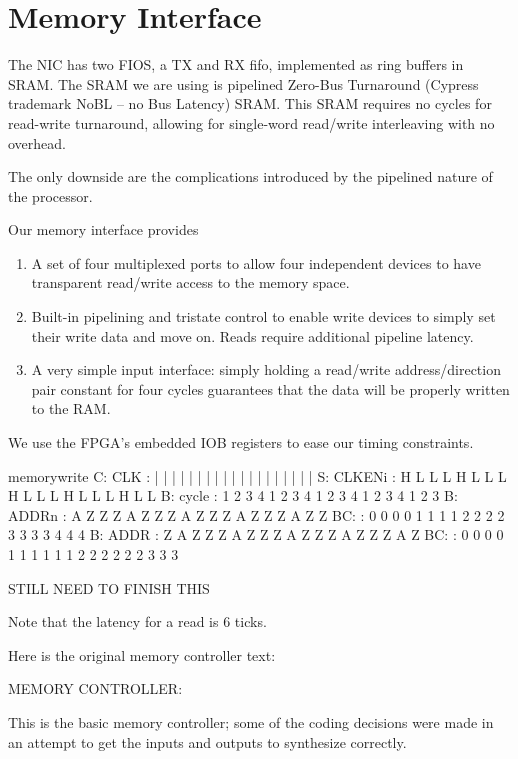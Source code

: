 \section{Memory Interface}
The NIC has two FIOS, a TX and RX fifo, implemented as ring buffers in
SRAM. The SRAM we are using is pipelined Zero-Bus Turnaround (Cypress
trademark NoBL -- no Bus Latency) SRAM. This SRAM requires no cycles
for read-write turnaround, allowing for single-word read/write
interleaving with no overhead.

The only downside are the complications introduced by the pipelined
nature of the processor.

Our memory interface provides
\begin{enumerate}
\item A set of four multiplexed ports to allow four independent
  devices to have transparent read/write access to the memory space.
\item Built-in pipelining and tristate control to enable write devices
  to simply set their write data and move on. Reads require additional
  pipeline latency.
\item A very simple input interface: simply holding a read/write
  address/direction pair constant for four cycles guarantees that the
  data will be properly written to the RAM.
\end{enumerate}

We use the FPGA's embedded IOB registers to ease our timing constraints. 

\begin{timing}{memorywrite}
C: CLK    :  |  |  |  |  |  |  |  |  |  |  |  |  |  |  |  |  |  |  | 
S: CLKENi :  H  L  L  L  H  L  L  L  H  L  L  L  H  L  L  L  H  L  L 
B: cycle  :  1  2  3  4  1  2  3  4  1  2  3  4  1  2  3  4  1  2  3 
B: ADDRn  :  A  Z  Z  Z  A  Z  Z  Z  A  Z  Z  Z  A  Z  Z  Z  A  Z  Z
BC:       :  0  0  0  0  1  1  1  1  2  2  2  2  3  3  3  3  4  4  4
B: ADDR   :  Z  A  Z  Z  Z  A  Z  Z  Z  A  Z  Z  Z  A  Z  Z  Z  A  Z
BC:       :  0  0  0  0  1  1  1  1  1  1  2  2  2  2  2  2  3  3  3
\end{timing}

STILL NEED TO FINISH THIS

Note that the latency for a read is 6 ticks. 


Here is the original memory controller text: 


MEMORY CONTROLLER:

This is the basic memory controller; some of the coding decisions were made in an attempt to get the inputs and outputs to synthesize correctly. 

